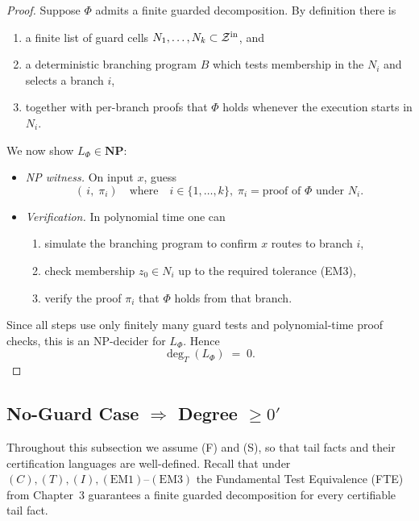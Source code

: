 \documentclass[12pt]{article}
\theoremstyle{definition}
\theoremstyle{plain}
\begin{document}
\begin{proof}
Suppose \(\Phi\) admits a finite guarded decomposition.  By definition there is
\begin{enumerate}[itemsep=2pt]
  \item a finite list of guard cells \(N_1,\dots,N_k\subset\mathcal Z^{\rm in}\), and
  \item a deterministic branching program \(B\) which tests membership in the \(N_i\) and selects a branch \(i\),
  \item together with per-branch proofs that \(\Phi\) holds whenever the execution starts in \(N_i\).
\end{enumerate}
We now show \(L_\Phi\in\mathbf{NP}\):
\begin{itemize}[itemsep=2pt]
  \item\emph{NP witness.}  On input \(x\), guess
    \[
      (\,i,\;\pi_i)
      \quad\text{where}\quad
      i\in\{1,\dots,k\},\;
      \pi_i = \text{proof of }\Phi\text{ under }N_i.
    \]
  \item\emph{Verification.}  In polynomial time one can
    \begin{enumerate}[itemsep=1pt]
      \item simulate the branching program to confirm \(x\) routes to branch \(i\),  
      \item check membership \(z_0\in N_i\) up to the required tolerance (EM3),  
      \item verify the proof \(\pi_i\) that \(\Phi\) holds from that branch.  
    \end{enumerate}
\end{itemize}
Since all steps use only finitely many guard tests and polynomial-time proof checks, this is an NP-decider for \(L_\Phi\).  Hence
\[
  \deg_T(L_\Phi)\;=\;0.
\]
\end{proof}


\subsection{No-Guard Case \texorpdfstring{$\Rightarrow$}{⇒} Degree \(\ge 0'\)}
\label{subsec:no-guard-to-0prime}

Throughout this subsection we assume (F) and (S), so that tail facts and their
certification languages are well-defined.  Recall that under
\((C),(T),(I),(\mathrm{EM1})\text{–}(\mathrm{EM3})\) the Fundamental Test
Equivalence (FTE) from Chapter~3 guarantees a finite guarded decomposition for
every certifiable tail fact.
\end{document}
